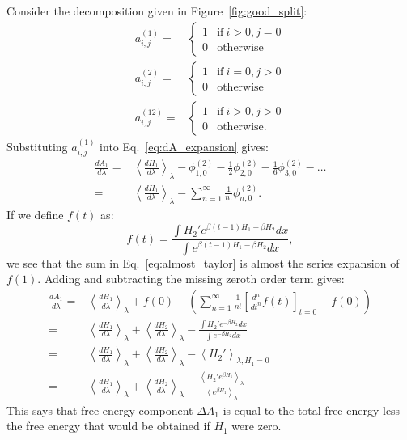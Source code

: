 \documentclass{article}
\begin{document}
Consider the decomposition given in Figure~\ref{fig:good_split}:
\begin{align*}
a_{i,j}^{(1)} =&
	\begin{cases}
	1 &\text{if}\ i>0,  j=0 \\
	0 &\text{otherwise}
	\end{cases} \\
a_{i,j}^{(2)} =&
	\begin{cases}
	1 &\text{if}\ i=0,  j>0 \\
	0 &\text{otherwise}
	\end{cases} \\
a_{i,j}^{(12)} =&
	\begin{cases}
	1 &\text{if}\ i>0,  j>0 \\
	0 &\text{otherwise}.
	\end{cases}
\end{align*}
Substituting $a_{i,j}^{(1)}$ into Eq.~\ref{eq:dA_expansion} gives:
\begin{align}
\frac{dA_1}{d\lambda} =& 
	\left\langle
		\frac{dH_1}{d\lambda}
	\right\rangle_\lambda -
	\phi_{1,0}^{(2)} -
	\frac{1}{2} \phi_{2,0}^{(2)} -
	\frac{1}{6} \phi_{3,0}^{(2)} - \ldots \nonumber\\
	=&
	\left\langle
		\frac{dH_1}{d\lambda}
	\right\rangle_\lambda -
	\sum_{n=1}^{\infty} \frac{1}{n!} \phi_{n,0}^{(2)}.
\label{eq:almost_taylor}
\end{align}
If we define $f(t)$ as:
\begin{equation}
f(t) = \frac
	{\int H_2' e^{\beta(t-1) H_1 - \beta H_2} dx}
	{\int e^{\beta(t-1) H_1 - \beta H_2} dx},
\end{equation}
we see that the sum in Eq.~\ref{eq:almost_taylor} is almost the series expansion of $f(1)$. Adding and subtracting the missing zeroth order term gives:
\begin{align}
\frac{dA_1}{d\lambda} =&
	\left\langle
		\frac{dH_1}{d\lambda}
	\right\rangle_\lambda +
	f(0) -
	\left(
		\sum_{n=1}^{\infty} \frac{1}{n!}
		\left[ \frac{d^n}{dt^n} f(t) \right]_{t=0}
		+ f(0)
	\right)\nonumber\\
=&
	\left\langle
		\frac{dH_1}{d\lambda}
	\right\rangle_\lambda +
	\left\langle
		\frac{dH_2}{d\lambda}
	\right\rangle_\lambda -
	\frac
		{\int H_2' e^{-\beta H_2} dx}
		{\int e^{-\beta H_2} dx} \nonumber\\
=&
	\left\langle
		\frac{dH_1}{d\lambda}
	\right\rangle_\lambda +
	\left\langle
		\frac{dH_2}{d\lambda}
	\right\rangle_\lambda -
	\left\langle
		H_2'
	\right\rangle_{\lambda, H_1=0} \label{eq:diff_ensemble}\\
=&
	\left\langle
		\frac{dH_1}{d\lambda}
	\right\rangle_\lambda +
	\left\langle
		\frac{dH_2}{d\lambda}
	\right\rangle_\lambda -
	\frac
		{\left\langle H_2' e^{\beta H_1} \right\rangle_\lambda}
		{\left\langle e^{\beta H_1} \right\rangle_\lambda}
	\label{eq:same_ensemble}
\end{align}
This says that free energy component $\Delta A_1$ is equal to the total free energy less the free energy that would be obtained if $H_1$ were zero.
\end{document}

